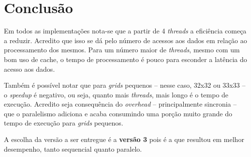\chapter{Conclusão}
\label{cha:conclusao}

Em todos as implementações nota-se que a partir de 4 \textit{threads} a eficiência começa a reduzir. Acredito que isso se dá pelo número de acessos aos dados em relação ao processamento dos mesmos. Para um número maior de \textit{threads}, mesmo com um bom uso de cache, o tempo de processamento é pouco para esconder a latência do acesso aos dados.

Também é possível notar que para \textit{grids} pequenos -- nesse caso, 32x32 ou 33x33 -- o \textit{speedup} é negativo, ou seja, quanto mais \textit{threads}, mais longo é o tempo de execução. Acredito seja consequência do \textit{overhead} -- principalmente sincronia -- que o paralelismo adiciona e acaba consumindo uma porção muito grande do tempo de execução para \textit{grids} pequenos.

A escolha da versão a ser entregue é a \textbf{versão 3} pois é a que resultou em melhor desempenho, tanto sequencial quanto paralelo.